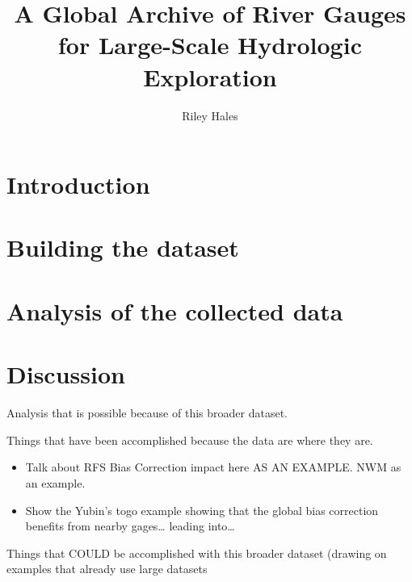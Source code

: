 \documentclass[preprint,12pt,authoryear]{elsarticle}
\begin{document}
\begin{frontmatter}

\title{A Global Archive of River Gauges for Large-Scale Hydrologic Exploration}

    \author[a]{Riley Hales}

    \begin{abstract}
    \end{abstract}

\end{frontmatter}

\section{Introduction}
\label{sec:introduction}

\section{Building the dataset}
\label{sec:building-the-dataset}


\section{Analysis of the collected data}
\label{sec:analysis-of-the-collected-data}


\section{Discussion}
\label{sec:discussion}

Analysis that is possible because of this broader dataset.

Things that have been accomplished because the data are where they are.

\begin{itemize}
\item Talk about RFS Bias Correction impact here AS AN EXAMPLE. NWM as an example.
\item Show the Yubin's togo example showing that the global bias correction benefits from nearby gages\ldots{} leading into\ldots
\end{itemize}

Things that COULD be accomplished with this broader dataset (drawing on examples that already use large datasets
\end{document}
